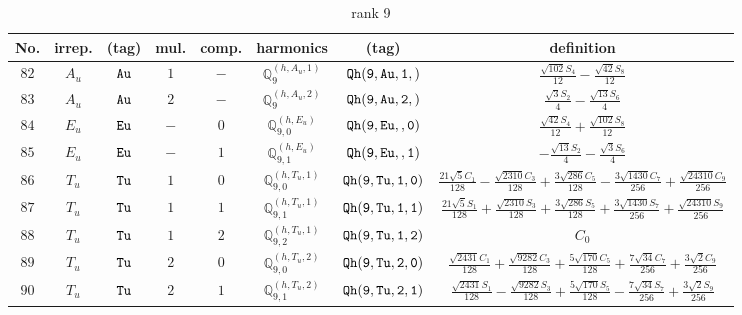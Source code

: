\documentclass[fleqn,8pt]{jsarticle}
\begin{document}
\begin{table}[ht!]
\begin{center}
\caption{rank 9}
\renewcommand{\arraystretch}{1.3}
\begin{tabular}{cccccccc} \hline \hline
No. & irrep. & (tag) & mul. & comp. & harmonics & (tag) & definition \\ \hline
$ 82 $ & $ A_{u} $ & $ {\tt Au} $ & $ 1 $ & $ - $ & $ \mathbb{Q}_{9}^{(h,A_{u},1)} $ & $ {\tt Qh(9,Au,1,)} $ & $ \frac{\sqrt{102} S_{4}}{12} - \frac{\sqrt{42} S_{8}}{12} $ \\
$ 83 $ & $ A_{u} $ & $ {\tt Au} $ & $ 2 $ & $ - $ & $ \mathbb{Q}_{9}^{(h,A_{u},2)} $ & $ {\tt Qh(9,Au,2,)} $ & $ \frac{\sqrt{3} S_{2}}{4} - \frac{\sqrt{13} S_{6}}{4} $ \\
$ 84 $ & $ E_{u} $ & $ {\tt Eu} $ & $ - $ & $ 0 $ & $ \mathbb{Q}_{9,0}^{(h,E_{u})} $ & $ {\tt Qh(9,Eu,,0)} $ & $ \frac{\sqrt{42} S_{4}}{12} + \frac{\sqrt{102} S_{8}}{12} $ \\
$ 85 $ & $ E_{u} $ & $ {\tt Eu} $ & $ - $ & $ 1 $ & $ \mathbb{Q}_{9,1}^{(h,E_{u})} $ & $ {\tt Qh(9,Eu,,1)} $ & $ - \frac{\sqrt{13} S_{2}}{4} - \frac{\sqrt{3} S_{6}}{4} $ \\
$ 86 $ & $ T_{u} $ & $ {\tt Tu} $ & $ 1 $ & $ 0 $ & $ \mathbb{Q}_{9,0}^{(h,T_{u},1)} $ & $ {\tt Qh(9,Tu,1,0)} $ & $ \frac{21 \sqrt{5} C_{1}}{128} - \frac{\sqrt{2310} C_{3}}{128} + \frac{3 \sqrt{286} C_{5}}{128} - \frac{3 \sqrt{1430} C_{7}}{256} + \frac{\sqrt{24310} C_{9}}{256} $ \\
$ 87 $ & $ T_{u} $ & $ {\tt Tu} $ & $ 1 $ & $ 1 $ & $ \mathbb{Q}_{9,1}^{(h,T_{u},1)} $ & $ {\tt Qh(9,Tu,1,1)} $ & $ \frac{21 \sqrt{5} S_{1}}{128} + \frac{\sqrt{2310} S_{3}}{128} + \frac{3 \sqrt{286} S_{5}}{128} + \frac{3 \sqrt{1430} S_{7}}{256} + \frac{\sqrt{24310} S_{9}}{256} $ \\
$ 88 $ & $ T_{u} $ & $ {\tt Tu} $ & $ 1 $ & $ 2 $ & $ \mathbb{Q}_{9,2}^{(h,T_{u},1)} $ & $ {\tt Qh(9,Tu,1,2)} $ & $ C_{0} $ \\
$ 89 $ & $ T_{u} $ & $ {\tt Tu} $ & $ 2 $ & $ 0 $ & $ \mathbb{Q}_{9,0}^{(h,T_{u},2)} $ & $ {\tt Qh(9,Tu,2,0)} $ & $ \frac{\sqrt{2431} C_{1}}{128} + \frac{\sqrt{9282} C_{3}}{128} + \frac{5 \sqrt{170} C_{5}}{128} + \frac{7 \sqrt{34} C_{7}}{256} + \frac{3 \sqrt{2} C_{9}}{256} $ \\
$ 90 $ & $ T_{u} $ & $ {\tt Tu} $ & $ 2 $ & $ 1 $ & $ \mathbb{Q}_{9,1}^{(h,T_{u},2)} $ & $ {\tt Qh(9,Tu,2,1)} $ & $ \frac{\sqrt{2431} S_{1}}{128} - \frac{\sqrt{9282} S_{3}}{128} + \frac{5 \sqrt{170} S_{5}}{128} - \frac{7 \sqrt{34} S_{7}}{256} + \frac{3 \sqrt{2} S_{9}}{256} $ \\

\end{tabular}
\end{center}
\end{table}
\end{document}
